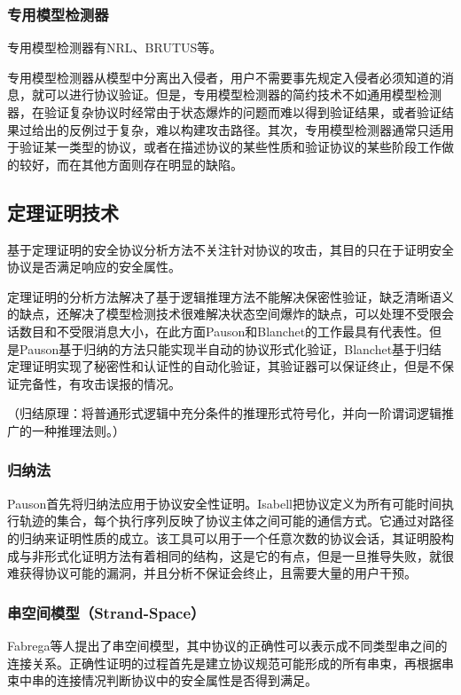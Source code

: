 \documentclass[cs4size,a4pape,UTF8]{ctexart}
\numberwithin{equation}{section}
\numberwithin{table}{section}
\numberwithin{figure}{section}
\begin{document}
\subsubsection{专用模型检测器}
专用模型检测器有NRL、BRUTUS等。

专用模型检测器从模型中分离出入侵者，用户不需要事先规定入侵者必须知道的消息，就可以进行协议验证。但是，专用模型检测器的简约技术不如通用模型检测器，在验证复杂协议时经常由于状态爆炸的问题而难以得到验证结果，或者验证结果过给出的反例过于复杂，难以构建攻击路径。其次，专用模型检测器通常只适用于验证某一类型的协议，或者在描述协议的某些性质和验证协议的某些阶段工作做的较好，而在其他方面则存在明显的缺陷\cite{3}。


\subsection{定理证明技术}
基于定理证明的安全协议分析方法不关注针对协议的攻击，其目的只在于证明安全协议是否满足响应的安全属性。

定理证明的分析方法解决了基于逻辑推理方法不能解决保密性验证，缺乏清晰语义的缺点，还解决了模型检测技术很难解决状态空间爆炸的缺点，可以处理不受限会话数目和不受限消息大小，在此方面Pauson和Blanchet的工作最具有代表性。但是Pauson基于归纳的方法只能实现半自动的协议形式化验证，Blanchet基于归结定理证明实现了秘密性和认证性的自动化验证，其验证器可以保证终止，但是不保证完备性，有攻击误报的情况\cite{6}。

（归结原理：将普通形式逻辑中充分条件的推理形式符号化，并向一阶谓词逻辑推广的一种推理法则。）

\subsubsection{归纳法}
Pauson首先将归纳法应用于协议安全性证明。Isabell把协议定义为所有可能时间执行轨迹的集合，每个执行序列反映了协议主体之间可能的通信方式。它通过对路径的归纳来证明性质的成立。该工具可以用于一个任意次数的协议会话，其证明股构成与非形式化证明方法有着相同的结构，这是它的有点，但是一旦推导失败，就很难获得协议可能的漏洞，并且分析不保证会终止，且需要大量的用户干预\cite{6}。

\subsubsection{串空间模型（Strand-Space）}
Fabrega等人提出了串空间模型，其中协议的正确性可以表示成不同类型串之间的连接关系。正确性证明的过程首先是建立协议规范可能形成的所有串束，再根据串束中串的连接情况判断协议中的安全属性是否得到满足。
\end{document}
